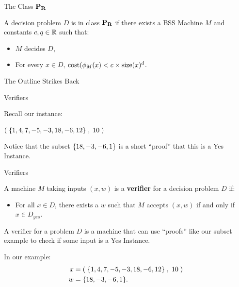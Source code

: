 \documentclass[c]{beamer}
\begin{document}
\begin{frame}{The Class $\mathbf{P_R}$}
  
  A decision problem $D$ is in class $\mathbf{P_R}$ if there exists a BSS
  Machine $M$ and constants $c, q \in \mathbb{R}$ such that:
  \begin{itemize}
  \item $M$ decides $D$,
  \item For every $x \in D$, $\text{cost}(\phi_M(x) < c \times \text{size}(x)^d$.
  \end{itemize}
  
\end{frame}

\begin{frame}{The Outline Strikes Back}
  \begin{center}
    \scaletopagewidth{\outlinefinal}
  \end{center}
\end{frame}

\begin{frame}{Verifiers}

  Recall our \subsum{} instance:

  \vspace{\baselineskip}

  $(\;\{1,4,7,-5,-3,18,-6,12\}\;, \;10\;)$

  \vspace{\baselineskip}

  Notice that the subset $\{18, -3, -6, 1\}$ is a short ``proof''
  that this is a Yes Instance.

  \vspace{\baselineskip}

\end{frame}

\begin{frame}{Verifiers}

  A machine $M$ taking inputs $(x, w)$ is a \textbf{verifier} for a decision
  problem $D$ if:

  \begin{itemize}
  \item[] For all $x \in D$, there exists a $w$ such that $M$ accepts
    $(x, w)$ if and only if $x \in D_{yes}$.
  \end{itemize}\pause

  A verifier for a problem $D$ is a machine that can use ``proofs''
  like our subset example to check if some input is a Yes
  Instance.\pause

  \vspace{\baselineskip}

  In our example: 
  \begin{align*}
    x &= (\;\{1,4,7,-5,-3,18,-6,12\}\;, \;10\;) \\
    w &= \{18, -3, -6,1\}.
  \end{align*}
\end{frame}
\end{document}
